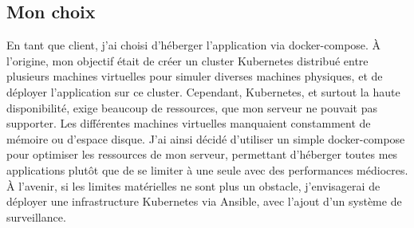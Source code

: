\subsection{Mon choix}\label{subsec:mon-choix}
En tant que client, j'ai choisi d'héberger l'application via docker-compose.
À l'origine, mon objectif était de créer un cluster Kubernetes distribué entre plusieurs machines virtuelles pour simuler diverses machines physiques, et de déployer l'application sur ce cluster.
Cependant, Kubernetes, et surtout la haute disponibilité, exige beaucoup de ressources, que mon serveur ne pouvait pas supporter.
Les différentes machines virtuelles manquaient constamment de mémoire ou d'espace disque.
J'ai ainsi décidé d'utiliser un simple docker-compose pour optimiser les ressources de mon serveur, permettant d'héberger toutes mes applications plutôt que de se limiter à une seule avec des performances médiocres.
À l'avenir, si les limites matérielles ne sont plus un obstacle, j'envisagerai de déployer une infrastructure Kubernetes via Ansible, avec l'ajout d'un système de surveillance.